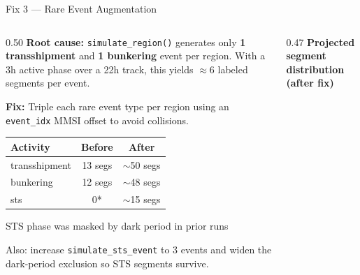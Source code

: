 \documentclass[aspectratio=169,10pt]{beamer}
\begin{document}
\begin{frame}{Fix 3 — Rare Event Augmentation}
  \begin{columns}[T]
    \begin{column}{0.50\textwidth}
      \textbf{Root cause:} \texttt{simulate\_region()} generates only
      \textbf{1 transshipment} and \textbf{1 bunkering} event per region.
      With a 3h active phase over a 22h track, this yields $\approx$6
      labeled segments per event.

      \bigskip
      \textbf{Fix:} Triple each rare event type per region using an
      \texttt{event\_idx} MMSI offset to avoid collisions.

      \medskip
      \begin{tabular}{lcc}
        \toprule
        Activity & Before & After \\
        \midrule
        transshipment & 13 segs & $\sim$50 segs \\
        bunkering & 12 segs & $\sim$48 segs \\
        sts & 0* & $\sim$15 segs \\
        \bottomrule
      \end{tabular}
      {\scriptsize *STS phase was masked by dark period in prior runs}

      \bigskip
      Also: increase \texttt{simulate\_sts\_event} to 3 events and
      widen the dark-period exclusion so STS segments survive.
    \end{column}
    \begin{column}{0.47\textwidth}
      \textbf{Projected segment distribution (after fix)}

    \end{column}
  \end{columns}
\end{frame}
\end{document}
